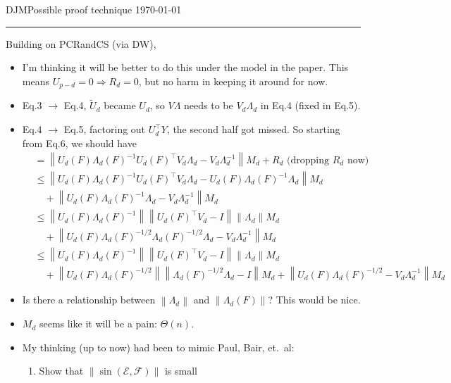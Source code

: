 \documentclass[11pt]{article}
\newcommand{\norm}[1]{\left\lVert #1 \right\rVert}
\begin{document}
\begin{center}
\noindent
DJM\hfill Possible proof technique \hfill \today \\
\rule{6.5in}{1pt}
\end{center}

Building on PCRandCS (via DW),
\begin{itemize}
\item I'm thinking it will be better to do this under the model in the
  paper. This means $U_{p-d}=0\Rightarrow R_d=0$, but no harm in
  keeping it around for now.
\item Eq.3 $\rightarrow$ Eq.4, $\tilde{U}_d$ became $U_d$, so
  $V\Lambda$ needs to be $V_d\Lambda_d$ in Eq.4 (fixed in Eq.5).
\item Eq.4 $\rightarrow$ Eq.5, factoring out $U_d^\top Y$, the second
  half got missed. So starting from Eq.6, we should have
  \begin{align}
  &=\norm{U_d(F)\Lambda_d(F)^{-1}U_d(F)^\top V_d\Lambda_d -
    V_d\Lambda_d^{-1}} M_d + R_d \mbox{ (dropping $R_d$ now)}\\
  &\leq \norm{U_d(F)\Lambda_d(F)^{-1}U_d(F)^\top V_d\Lambda_d -
    U_d(F)\Lambda_d(F)^{-1}\Lambda_d}M_d\\
  &\quad + \norm{U_d(F)\Lambda_d(F)^{-1}\Lambda_d -
    V_d\Lambda_d^{-1}} M_d\\
  &\leq \norm{U_d(F)\Lambda_d(F)^{-1}}\norm{U_d(F)^\top
    V_d-I}\norm{\Lambda_d} M_d\\
  &\quad +\norm{U_d(F)\Lambda_d(F)^{-1/2}\Lambda_d(F)^{-1/2}\Lambda_d -
    V_d\Lambda_d^{-1}} M_d\\
  &\leq \norm{U_d(F)\Lambda_d(F)^{-1}}\norm{U_d(F)^\top
    V_d-I}\norm{\Lambda_d} M_d\\
  &\quad
    +\norm{U_d(F)\Lambda_d(F)^{-1/2}}\norm{\Lambda_d(F)^{-1/2}\Lambda_d
    - I}M_d + \norm{U_d(F)\Lambda_d(F)^{-1/2}-
    V_d\Lambda_d^{-1}} M_d
  \end{align}
\item Is there a relationship between $\norm{\Lambda_d}$ and
  $\norm{\Lambda_d(F)}$? This would be nice.
\item $M_d$ seems like it will be a pain: $\Theta(n)$.
\item My thinking (up to now) had been to mimic Paul, Bair, et.\ al:
  \begin{enumerate}
  \item Show that $\norm{\sin(\mathcal{E},\mathcal{F})}$ is small

\end{enumerate}
\end{itemize}
\end{document}
